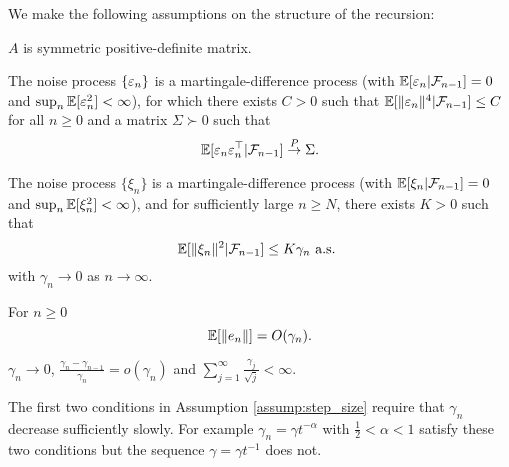 We make the following assumptions on the structure of the recursion:
\begin{assumption} \label{assump:psd}
  $A$ is symmetric positive-definite matrix.
\end{assumption}
\begin{assumption} \label{assump:noise1}
    The noise process $\{ \varepsilon_{n} \}$ is a martingale-difference process (with  $\mathbb{E}[\varepsilon_n\vert\mathcal F_{n-1}]=0$  and  $\sup_n \mathbb{E}[\varepsilon_n^2] < \infty$), for which    there exists $C>0$ such that $\mathbb{E} [\Vert \varepsilon_n \Vert^4 | \mathcal{F}_{n-1}] \leq C$ for all $n \geq 0$ and a matrix $\Sigma \succ 0$ such that
    \[\mathbb{E}[\varepsilon_n\varepsilon_n^\top\vert\mathcal F_{n-1}]\overset{P}{\to} \Sigma.\]
\end{assumption}
\begin{assumption} \label{assump:noise2}
    The noise process $\{ \xi_{n} \}$ is a martingale-difference process (with  $\mathbb{E}[\xi_n\vert\mathcal F_{n-1}]=0$ and $\sup_n \mathbb{E}[\xi_n^2] < \infty$), and for sufficiently large $n \geq N$, there exists $K > 0$ such that
    \[ \mathbb{E}[\Vert \xi_n\Vert^2\vert\mathcal F_{n-1}] \leq K\gamma_n \text{ a.s. } \]
    with $\gamma_n \to 0$ as $n \to \infty$.
\end{assumption}
\begin{assumption} \label{assump:remainder}
  For $n \geq 0$
    \[
    \mathbb{E}[\Vert e_n \Vert] = O(\gamma_n).
    \]
\end{assumption}
\begin{assumption}\label{assump:step_size}
  $\gamma_n \to 0$, $\frac{\gamma_n-\gamma_{n-1}}{\gamma_n} = o(\gamma_n)$ and $\sum_{j=1}^{\infty} \frac{\gamma_j}{\sqrt{j}} < \infty$.
\end{assumption}
The first two conditions in Assumption \ref{assump:step_size} require that $\gamma_n$ decrease sufficiently slowly. For example $\gamma_n = \gamma t^{-\alpha}$ with $ \frac{1}{2} < \alpha < 1$ satisfy these two conditions
but the sequence $\gamma = \gamma t^{-1}$ does not.


